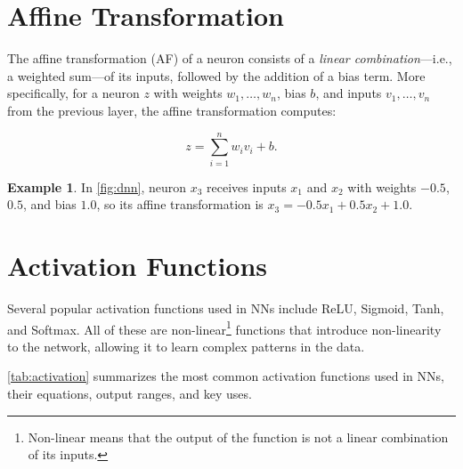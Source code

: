 \documentclass[oneside,11pt,dvipsnames]{book}
\numberwithin{equation}{section}
\theoremstyle{definition}
\newtheorem{example}{Example}[section]
\theoremstyle{remark}
\begin{document}
\section{Affine Transformation}\label{sec:affine}

The affine transformation (AF) of a neuron consists of a \emph{linear combination}---i.e., a weighted sum---of its inputs, followed by the addition of a bias term. More specifically, for a neuron $z$ with weights \(w_1, \dots, w_n\), bias \(b\), and inputs \(v_1, \dots, v_n\) from the previous layer, the affine transformation computes:

\begin{equation}\label{eq:affine}   
    z = \sum_{i=1}^{n} w_i v_i + b.
\end{equation}


\begin{example}
In \autoref{fig:dnn}, neuron \(x_3\) receives inputs \(x_1\) and \(x_2\) with weights \(-0.5\), \(0.5\), and bias \(1.0\), so its affine transformation is $x_3 = -0.5 x_1 + 0.5 x_2 + 1.0$.
\end{example}


\section{Activation Functions}\label{sec:activation}
Several popular activation functions used in NNs include ReLU, Sigmoid, Tanh, and Softmax. All of these are non-linear\footnote{Non-linear means that the output of the function is not a linear combination of its inputs.} functions that introduce non-linearity to the network, allowing it to learn complex patterns in the data.



\autoref{tab:activation} summarizes the most common activation functions used in NNs, their equations, output ranges, and key uses.
\end{document}
